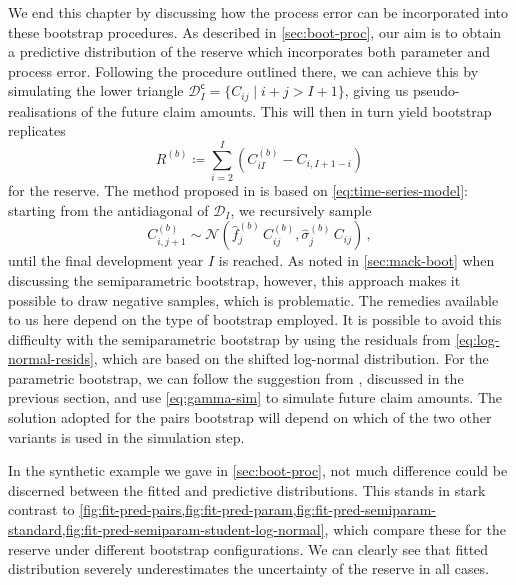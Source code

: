 \documentclass[a4paper]{book}
\begin{document}
We end this chapter by discussing how the process error can be incorporated into these bootstrap procedures. As described in \cref{sec:boot-proc}, our aim is to obtain a predictive distribution of the reserve which incorporates both parameter and process error. Following the procedure outlined there, we can achieve this by simulating the lower triangle $\mathcal{D}^{\mathsf{c}}_I = \{ C_{ij} \mid i + j > I + 1 \}$, giving us pseudo-realisations of the future claim amounts. This will then in turn yield bootstrap replicates
\begin{equation}
  R^{(b)} \coloneqq \sum_{i = 2}^I (C^{(b)}_{iI} - C_{i, I + 1 - i})
\end{equation}
for the reserve. The method proposed in \cite{england:dist} is based on \eqref{eq:time-series-model}: starting from the antidiagonal of $\mathcal{D}_I$, we recursively sample
\begin{equation} \label{eq:normal-sampling}
  C^{(b)}_{i, j + 1} \sim \mathcal{N}(\widehat{f}^{(b)}_j \, C^{(b)}_{ij}, \widehat{\sigma}^{(b)}_j \, C_{ij}) \,,
\end{equation}
\noindent until the final development year $I$ is reached. As noted in \cref{sec:mack-boot} when discussing the semiparametric bootstrap, however, this approach makes it possible to draw negative samples, which is problematic. The remedies available to us here depend on the type of bootstrap employed. It is possible to avoid this difficulty with the semiparametric bootstrap by using the residuals from \cref{eq:log-normal-resids}, which are based on the shifted log-normal distribution. For the parametric bootstrap, we can follow the suggestion from \cite{england:dist}, discussed in the previous section, and use \cref{eq:gamma-sim} to simulate future claim amounts. The solution adopted for the pairs bootstrap will depend on which of the two other variants is used in the simulation step.

In the synthetic example we gave in \cref{sec:boot-proc}, not much difference could be discerned between the fitted and predictive distributions. This stands in stark contrast to \cref{fig:fit-pred-pairs,fig:fit-pred-param,fig:fit-pred-semiparam-standard,fig:fit-pred-semiparam-student-log-normal}, which compare these for the reserve under different bootstrap configurations. We can clearly see that fitted distribution severely underestimates the uncertainty of the reserve in all cases.
\end{document}
